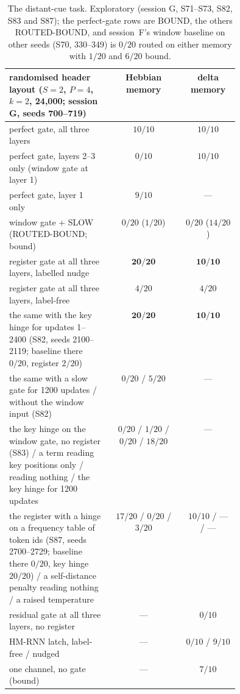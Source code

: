 \documentclass[11pt]{article}
\begin{document}
\begin{table}[H]
\centering
\footnotesize
\setlength{\tabcolsep}{4pt}
\begin{tabular}{@{}>{\raggedright\arraybackslash}p{0.44\linewidth}cc@{}}
\toprule
randomised header layout ($S{=}2$, $P{=}4$, $k{=}2$, 24{,}000; session G, seeds 700--719) & Hebbian memory & delta memory\\
\midrule
perfect gate, all three layers & $10/10$ & $10/10$\\
perfect gate, layers 2--3 only (window gate at layer 1) & $0/10$ & $10/10$\\
perfect gate, layer 1 only & $9/10$ & ---\\
window gate + SLOW (ROUTED-BOUND; bound) & $0/20$ ($1/20$) & $0/20$ ($14/20$)\\
register gate at all three layers, labelled nudge & $\mathbf{20/20}$ & $\mathbf{10/10}$\\
register gate at all three layers, label-free & $4/20$ & $4/20$\\
the same with the key hinge for updates 1--2400 (S82, seeds 2100--2119; baseline there $0/20$, register $2/20$) & $\mathbf{20/20}$ & $\mathbf{10/10}$\\
the same with a slow gate for 1200 updates / without the window input (S82) & $0/20$ / $5/20$ & ---\\
the key hinge on the window gate, no register (S83) / a term reading key positions only / reading nothing / the key hinge for 1200 updates & $0/20$ / $1/20$ / $0/20$ / $18/20$ & ---\\
the register with a hinge on a frequency table of token ids (S87, seeds 2700--2729; baseline there $0/20$, key hinge $20/20$) / a self-distance penalty reading nothing / a raised temperature & $17/20$ / $0/20$ / $3/20$ & $10/10$ / --- / ---\\
residual gate at all three layers, no register & --- & $0/10$\\
HM-RNN latch, label-free / nudged & --- & $0/10$ / $9/10$\\
one channel, no gate (bound) & --- & $7/10$\\
\bottomrule
\end{tabular}
\caption{The distant-cue task. Exploratory (session G, S71--S73, S82, S83 and S87); the perfect-gate rows are BOUND, the others ROUTED-BOUND, and session~F's window baseline on other seeds (S70, 330--349) is $0/20$ routed on either memory with $1/20$ and $6/20$ bound.}
\label{tab:far}
\end{table}
\end{document}
